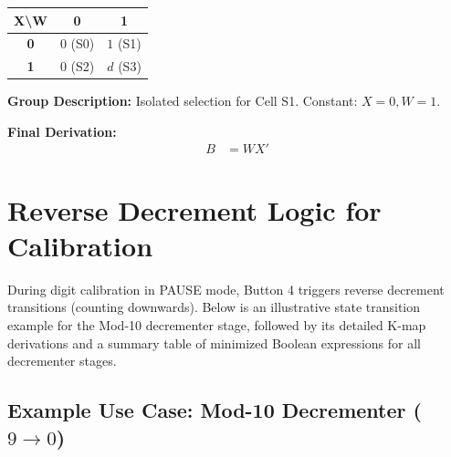\documentclass[journal,12pt,onecolumn]{IEEEtran}
\begin{document}
		\begin{table}[H]
			\centering
			\begin{tabular}{|c|c|c|}
				\hline
				\textbf{X\textbackslash W} & \textbf{0} & \textbf{1} \\
				\hline
				\textbf{0} & $0$ (S0) & \cellcolor{grpRed}$1$ (S1) \\
				\hline
				\textbf{1} & $0$ (S2) & \cellcolor{grpRed}$d$ (S3) \\
				\hline
			\end{tabular}
		\end{table}
		
		\begin{justify}
			\textbf{Group Description:} Isolated selection for Cell S1. Constant: $X=0, W=1$.
			
			\textbf{Final Derivation:}
			\begin{align}
				B &= WX'
			\end{align}
		\end{justify}
		
		\newpage
		
		\section{\textbf{Reverse Decrement Logic for Calibration}}
		\begin{justify}
			During digit calibration in PAUSE mode, Button 4 triggers reverse decrement transitions (counting downwards). Below is an illustrative state transition example for the Mod-10 decrementer stage, followed by its detailed K-map derivations and a summary table of minimized Boolean expressions for all decrementer stages.
		\end{justify}
		\vspace{1em}
		
		\subsection{Example Use Case: Mod-10 Decrementer ($9 \rightarrow 0$)}
		
\end{document}
